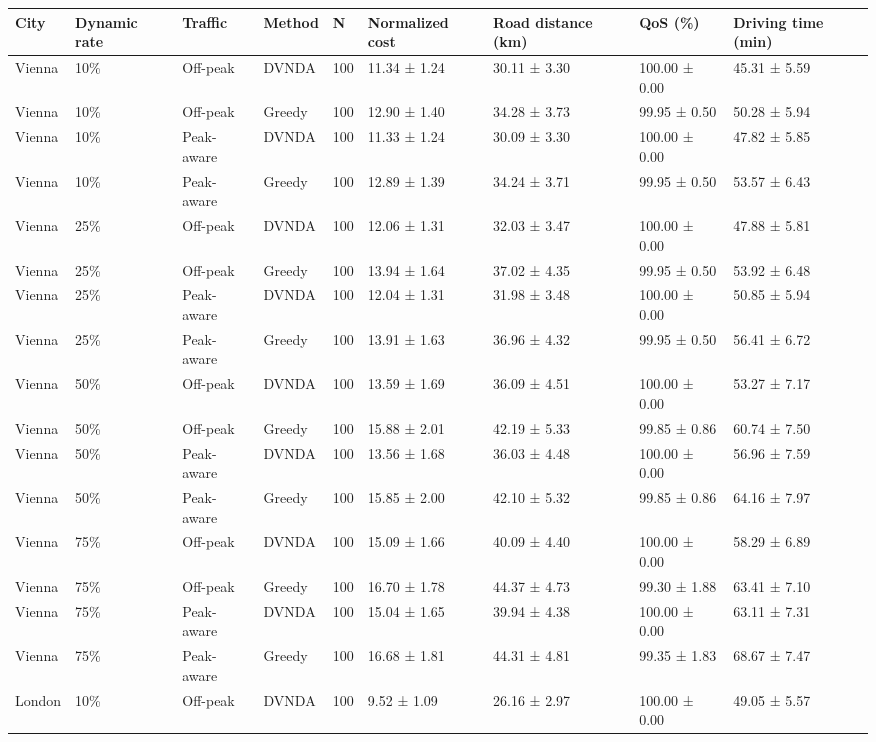 \begin{tabular}{lllllllll}
\hline
City & Dynamic rate & Traffic & Method & N & Normalized cost & Road distance (km) & QoS (\%) & Driving time (min) \\
\hline
Vienna & 10\% & Off-peak & DVNDA & 100 & 11.34 ± 1.24 & 30.11 ± 3.30 & 100.00 ± 0.00 & 45.31 ± 5.59 \\
Vienna & 10\% & Off-peak & Greedy & 100 & 12.90 ± 1.40 & 34.28 ± 3.73 & 99.95 ± 0.50 & 50.28 ± 5.94 \\
Vienna & 10\% & Peak-aware & DVNDA & 100 & 11.33 ± 1.24 & 30.09 ± 3.30 & 100.00 ± 0.00 & 47.82 ± 5.85 \\
Vienna & 10\% & Peak-aware & Greedy & 100 & 12.89 ± 1.39 & 34.24 ± 3.71 & 99.95 ± 0.50 & 53.57 ± 6.43 \\
Vienna & 25\% & Off-peak & DVNDA & 100 & 12.06 ± 1.31 & 32.03 ± 3.47 & 100.00 ± 0.00 & 47.88 ± 5.81 \\
Vienna & 25\% & Off-peak & Greedy & 100 & 13.94 ± 1.64 & 37.02 ± 4.35 & 99.95 ± 0.50 & 53.92 ± 6.48 \\
Vienna & 25\% & Peak-aware & DVNDA & 100 & 12.04 ± 1.31 & 31.98 ± 3.48 & 100.00 ± 0.00 & 50.85 ± 5.94 \\
Vienna & 25\% & Peak-aware & Greedy & 100 & 13.91 ± 1.63 & 36.96 ± 4.32 & 99.95 ± 0.50 & 56.41 ± 6.72 \\
Vienna & 50\% & Off-peak & DVNDA & 100 & 13.59 ± 1.69 & 36.09 ± 4.51 & 100.00 ± 0.00 & 53.27 ± 7.17 \\
Vienna & 50\% & Off-peak & Greedy & 100 & 15.88 ± 2.01 & 42.19 ± 5.33 & 99.85 ± 0.86 & 60.74 ± 7.50 \\
Vienna & 50\% & Peak-aware & DVNDA & 100 & 13.56 ± 1.68 & 36.03 ± 4.48 & 100.00 ± 0.00 & 56.96 ± 7.59 \\
Vienna & 50\% & Peak-aware & Greedy & 100 & 15.85 ± 2.00 & 42.10 ± 5.32 & 99.85 ± 0.86 & 64.16 ± 7.97 \\
Vienna & 75\% & Off-peak & DVNDA & 100 & 15.09 ± 1.66 & 40.09 ± 4.40 & 100.00 ± 0.00 & 58.29 ± 6.89 \\
Vienna & 75\% & Off-peak & Greedy & 100 & 16.70 ± 1.78 & 44.37 ± 4.73 & 99.30 ± 1.88 & 63.41 ± 7.10 \\
Vienna & 75\% & Peak-aware & DVNDA & 100 & 15.04 ± 1.65 & 39.94 ± 4.38 & 100.00 ± 0.00 & 63.11 ± 7.31 \\
Vienna & 75\% & Peak-aware & Greedy & 100 & 16.68 ± 1.81 & 44.31 ± 4.81 & 99.35 ± 1.83 & 68.67 ± 7.47 \\
London & 10\% & Off-peak & DVNDA & 100 & 9.52 ± 1.09 & 26.16 ± 2.97 & 100.00 ± 0.00 & 49.05 ± 5.57 \\

\end{tabular}
